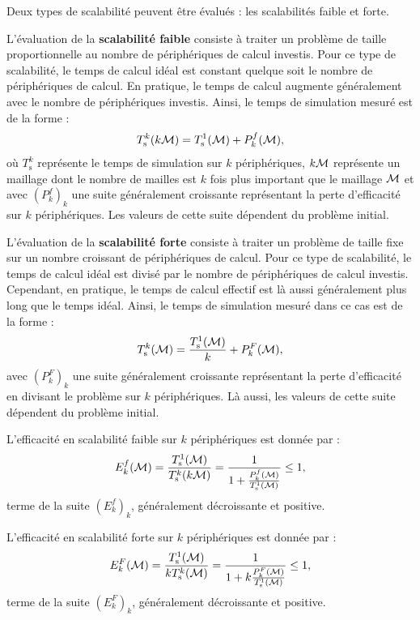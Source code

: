 Deux types de scalabilité peuvent être évalués : les scalabilités
faible et forte.

L'évaluation de la \textbf{scalabilité faible}
consiste à traiter un problème de taille proportionnelle
au nombre de périphériques de calcul investis. Pour ce type de scalabilité,
le temps de calcul idéal est constant quelque soit le nombre
de périphériques de calcul.
En pratique, le temps de calcul augmente généralement avec le nombre de
périphériques investis.
Ainsi, le temps de simulation mesuré est de la forme :
\begin{align}
T_\mathrm{s}^k(k \mathcal{M}) = T_\mathrm{s}^1(\mathcal{M}) + P_k^f(\mathcal{M}) ,
\end{align}
où $T_\mathrm{s}^k$ représente le temps de simulation sur $k$
périphériques, $k \mathcal{M}$ représente un maillage dont le nombre
de mailles est $k$ fois plus important que le maillage $\mathcal{M}$ et
avec $(P_k^f)_k$ une suite généralement croissante représentant
la perte d'efficacité sur $k$ périphériques. 
Les valeurs de cette suite dépendent du problème initial.


L'évaluation de la \textbf{scalabilité forte}
consiste à traiter un problème de taille fixe
sur un nombre croissant de périphériques de calcul.
Pour ce type de scalabilité,
le temps de calcul idéal est divisé par le nombre
de périphériques de calcul investis.
Cependant, en pratique, le temps de calcul effectif
est là aussi généralement plus long que le temps idéal.
Ainsi, le temps de simulation mesuré dans ce cas est de la forme :
\begin{align}
T_\mathrm{s}^k(\mathcal{M}) = \frac{T_\mathrm{s}^1(\mathcal{M})}{k} + P_k^F(\mathcal{M}) ,
\end{align}
avec $(P_k^F)_k$ une suite généralement croissante représentant
la perte d'efficacité en divisant le problème sur $k$ périphériques. 
Là aussi, les valeurs de cette suite dépendent du problème initial.


L'efficacité en scalabilité faible sur $k$ périphériques est donnée par :
\begin{align}
	E_k^f(\mathcal{M}) = \frac{T_\mathrm{s}^1(\mathcal{M})}{T_\mathrm{s}^k(k\mathcal{M})}
	= \frac{1}{1 + \frac{P_k^f(\mathcal{M})}{T_\mathrm{s}^1(\mathcal{M})}} \le 1 ,
\end{align}
terme de la suite $(E_k^f)_k$, généralement décroissante et positive.

L'efficacité en scalabilité forte sur $k$ périphériques est donnée par :
\begin{align}
	E_k^F(\mathcal{M}) = \frac{T_\mathrm{s}^1(\mathcal{M})}{k T_\mathrm{s}^k(\mathcal{M})}
	= \frac{1}{1 + k \frac{P_k^F(\mathcal{M})}{T_\mathrm{s}^1(\mathcal{M})}} \le 1 ,
\end{align}
terme de la suite $(E_k^F)_k$, généralement décroissante et positive.

